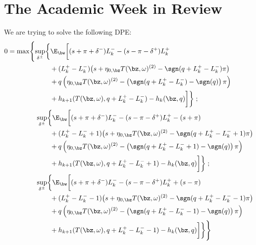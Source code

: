 \documentclass[12pt]{article}
\begin{document}
\section*{The Academic Week in Review}
We are trying to solve the following DPE:
\begin{align}
\begin{split}
0 & = \max \Biggl\lbrace 
\sup_{\delta^\pm} \biggl\lbrace \E_{\bw} \biggl[
(s + \pi + \delta^-)L_k^- - (s - \pi - \delta^+)L_k^+ \\
& \hphantom{\sup_{\bu} \biggl\lbrace \E_{\bw} \biggl[ {}+{}} + (L_k^+ - L_k^-) \bigl( s + \eta_{0,\bz} T(\bz, \omega)^{(2)}  -\sgn( q + L_k^+ - L_k^-)\pi   \bigr) \\
& \hphantom{\sup_{\bu} \biggl\lbrace \E_{\bw} \biggl[ {}+{}} + q\left( \eta_{0,\bz} T(\bz, \omega)^{(2)}  -\left( \sgn( q + L_k^+ - L_k^-) - \sgn(q) \right) \pi \right) \\
& \hphantom{\sup_{\bu} \biggl\lbrace \E_{\bw} \biggl[ {}+{}} + h_{k+1}(T(\bz,\omega), q + L_k^+ - L_k^- ) -  h_k(\bz,q) \biggr] \biggr\rbrace \; ;\\
& \hphantom{{}={} \max \biggl\lbrace } \sup_{\delta^\pm} \biggl\lbrace \E_{\bw} \biggl[
(s + \pi + \delta^-)L_k^- - (s - \pi - \delta^+)L_k^+ - (s + \pi)\\
& \hphantom{\sup_{\bu} \biggl\lbrace \E_{\bw} \biggl[ {}+{}} + (L_k^+ - L_k^- +1) \bigl( s + \eta_{0,\bz} T(\bz, \omega)^{(2)}  -\sgn( q + L_k^+ - L_k^- +1)\pi   \bigr) \\
& \hphantom{\sup_{\bu} \biggl\lbrace \E_{\bw} \biggl[ {}+{}} + q\left( \eta_{0,\bz} T(\bz, \omega)^{(2)}  -\left( \sgn( q + L_k^+ - L_k^- +1) - \sgn(q) \right) \pi \right) \\
& \hphantom{\sup_{\bu} \biggl\lbrace \E_{\bw} \biggl[ {}+{}} + h_{k+1}(T(\bz,\omega), q + L_k^+ - L_k^- + 1) -  h_k(\bz,q) \biggr] \biggr\rbrace \; ; \\
& \hphantom{{}={} \max \biggl\lbrace } \sup_{\delta^\pm} \biggl\lbrace \E_{\bw} \biggl[
(s + \pi + \delta^-)L_k^- - (s - \pi - \delta^+)L_k^+ + (s - \pi) \\
& \hphantom{\sup_{\bu} \biggl\lbrace \E_{\bw} \biggl[ {}+{}} + (L_k^+ - L_k^- -1) \bigl( s + \eta_{0,\bz} T(\bz, \omega)^{(2)}  -\sgn( q + L_k^+ - L_k^- -1)\pi   \bigr) \\
& \hphantom{\sup_{\bu} \biggl\lbrace \E_{\bw} \biggl[ {}+{}} + q\left( \eta_{0,\bz} T(\bz, \omega)^{(2)}  -\left( \sgn( q + L_k^+ - L_k^- -1) - \sgn(q) \right) \pi \right) \\
& \hphantom{\sup_{\bu} \biggl\lbrace \E_{\bw} \biggl[ {}+{}} + h_{k+1}(T(\bz,\omega), q + L_k^+ - L_k^- -1) -  h_k(\bz,q) \biggr] \biggr\rbrace  \Biggr\rbrace
\end{split}
\end{align}
\end{document}
